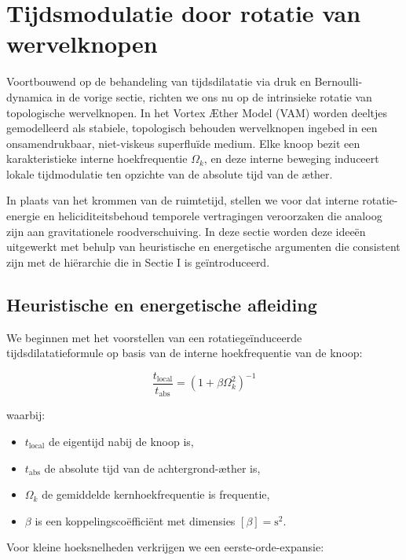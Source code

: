 \section{Tijdsmodulatie door rotatie van wervelknopen}

Voortbouwend op de behandeling van tijdsdilatatie via druk en Bernoulli-dynamica in de vorige sectie, richten we ons nu op de intrinsieke rotatie van topologische wervelknopen. In het Vortex Æther Model (VAM) worden deeltjes gemodelleerd als stabiele, topologisch behouden wervelknopen ingebed in een onsamendrukbaar, niet-viskeus superfluïde medium. Elke knoop bezit een karakteristieke interne hoekfrequentie $\Omega_k$, en deze interne beweging induceert lokale tijdmodulatie ten opzichte van de absolute tijd van de æther.

In plaats van het krommen van de ruimtetijd, stellen we voor dat interne rotatie-energie en heliciditeitsbehoud temporele vertragingen veroorzaken die analoog zijn aan gravitationele roodverschuiving. In deze sectie worden deze ideeën uitgewerkt met behulp van heuristische en energetische argumenten die consistent zijn met de hiërarchie die in Sectie I is geïntroduceerd.

\subsection{Heuristische en energetische afleiding}

We beginnen met het voorstellen van een rotatiegeïnduceerde tijdsdilatatieformule op basis van de interne hoekfrequentie van de knoop:

\begin{equation}
\frac{t_{\text{local}}}{t_{\text{abs}}} = \left(1 + \beta \Omega_k^2 \right)^{-1}\label{eq:rotational_induced_time_dilation}
\end{equation}

waarbij:

\begin{itemize}
\item $t_{\text{local}}$ de eigentijd nabij de knoop is,
\item $t_{\text{abs}}$ de absolute tijd van de achtergrond-æther is,
\item $\Omega_k$ de gemiddelde kernhoekfrequentie is frequentie,
\item $\beta$ is een koppelingscoëfficiënt met dimensies $[\beta] = \text{s}^2$.
\end{itemize}

Voor kleine hoeksnelheden verkrijgen we een eerste-orde-expansie:

